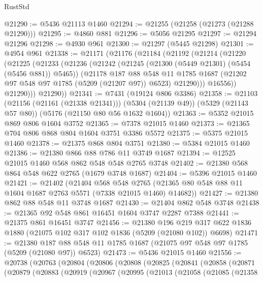 \begin{lexlean}{RustStd}
\begin{coremodule}
@21290 := @5436 @21113 @1460
@21294 := @21255 (@21258 (@21273 (@21288 @21290)))
@21295 := @4860 @881
@21296 := @5056 @21295
@21297 := @21294 @21296
@21298 := @4930 @961
@21300 := @21297 (@5445 @21298)
@21301 := @4954 @961
@21338 := @21171
    (@21176
      (@21184
        (@21192
          (@21214
            (@21220
              (@21225
                (@21233
                  (@21236
                    (@21242
                      (@21245 (@21300 (@5449 @21301) (@5454 (@5456 @881)) @5465))
                      (@21178
                        @187
                        @88
                        @548
                        @11
                        @1785
                        @1687
                        (@21202 @97 @548 @97 @1785 (@5209 (@21207 @97)) @6523)
                        @21290)))
                  @16556))
              @21290)))
        @21290))
@21341 := @7431 (@19124 @806 @3386)
@21358 := @21103
    (@21156 (@21161 (@21338 @21341)))
    (@5304 (@21139 @49))
    (@5329 (@21143 @57 @80))
    (@5176 (@21150 @80 @56 @1632 @1604))
@21363 := @5352 @21015 @869 @806 @1604 @3752
@21365 := @7378 @21015 @1460
@21373 := @21365 @704 @806 @868 @804 @1604 @3751 @3386 @5572
@21375 := @5375 @21015 @1460
@21378 := @21375 @868 @804 @3751
@21380 := @5384 @21015 @1460
@21386 := @21380 @866 @88 @786 @11 @3749 @1687
@21394 := @12525 @21015 @1460 @568 @862 @548 @548 @2765 @3748
@21402 := @21380 @568 @864 @548 @622 @2765 (@1679 @3748 @1687)
@21404 := @5396 @21015 @1460
@21421 := @21402
    (@21404
      @568
      @548
      @2765
      (@21365 @80 @548 @88 @11 @1604 @1687 @2763 @5571 (@7338 @21015 @1460) @14682))
@21427 := @21380 @862 @88 @548 @11 @3748 @1687
@21430 := @21404 @862 @548 @3748
@21438 := @21365 @92 @548 @861 @16451 @1604 @3747 @2287 @7388
@21441 := @21375 @861 @16451 @3747
@21456 := @21380
    @196
    @219
    @317
    @622
    @1836
    @1880
    (@21075 @102 @317 @102 @1836 (@5209 (@21080 @102)) @6698)
@21471 := @21380
    @187
    @88
    @548
    @11
    @1785
    @1687
    (@21075 @97 @548 @97 @1785 (@5209 (@21080 @97)) @6523)
@21473 := @5436 @21015 @1460
@21556 := @20738
    (@20763
      (@20804
        (@20806
          (@20808
            (@20825
              (@20841
                (@20858
                  (@20871
                    (@20879
                      (@20883
                        (@20919
                          (@20967
                            (@20995
                              (@21013
                                (@21058
                                  (@21085
                                    (@21358

\end{coremodule}
\end{lexlean}
